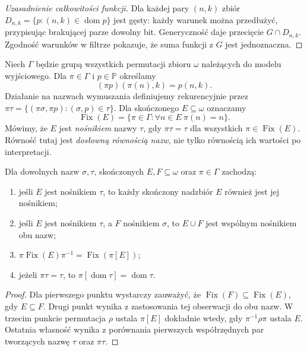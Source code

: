 \begin{proof}[Uzasadnienie całkowitości funkcji]
Dla każdej pary $(n,k)$ zbiór
$D_{n,k}=\{p:(n,k)\in\operatorname{dom}p\}$
jest gęsty: każdy warunek można przedłużyć,
przypisując brakującej parze dowolny bit.
Generyczność daje przecięcie $G\cap D_{n,k}$.
Zgodność warunków w filtrze pokazuje,
że suma funkcji z $G$ jest jednoznaczna.
\end{proof}

\begin{definicja}
\label{def:sym36-support}
Niech $\Gamma$ będzie grupą wszystkich permutacji
zbioru $\omega$ należących do modelu wyjściowego.
Dla $\pi\in\Gamma$ i $p\in\mathbb P$ określamy
\[
 (\pi p)(\pi(n),k)=p(n,k).
\]
Działanie na nazwach wymuszania definiujemy
rekurencyjnie przez
$\pi\tau=\{(\pi\sigma,\pi p):(\sigma,p)\in\tau\}$.
Dla skończonego $E\subseteq\omega$ oznaczamy
\[
 \operatorname{Fix}(E)
 =\{\pi\in\Gamma:\forall n\in E\ \pi(n)=n\}.
\]
Mówimy, że $E$ jest \emph{nośnikiem} nazwy $\tau$,
gdy $\pi\tau=\tau$ dla wszystkich
$\pi\in\operatorname{Fix}(E)$.
Równość tutaj jest \emph{dosłowną równością nazw},
nie tylko równością ich wartości po interpretacji.
\end{definicja}

\begin{lemat}
\label{lem:sym36-supports}
Dla dowolnych nazw $\sigma,\tau$, skończonych
$E,F\subseteq\omega$ oraz $\pi\in\Gamma$ zachodzą:
\begin{enumerate}
\item jeśli $E$ jest nośnikiem $\tau$, to każdy
skończony nadzbiór $E$ również jest jej nośnikiem;
\item jeśli $E$ jest nośnikiem $\tau$, a $F$ nośnikiem
$\sigma$, to $E\cup F$ jest wspólnym nośnikiem obu nazw;
\item $\pi\operatorname{Fix}(E)\pi^{-1}
=\operatorname{Fix}(\pi[E])$;
\item jeżeli $\pi\tau=\tau$, to
$\pi[\operatorname{dom}\tau]=\operatorname{dom}\tau$.
\end{enumerate}
\end{lemat}
\begin{proof}
Dla pierwszego punktu wystarczy zauważyć,
że $\operatorname{Fix}(F)\subseteq\operatorname{Fix}(E)$,
gdy $E\subseteq F$. Drugi punkt wynika z zastosowania
tej obserwacji do obu nazw. W trzecim punkcie
permutacja $\rho$ ustala $\pi[E]$ dokładnie wtedy,
gdy $\pi^{-1}\rho\pi$ ustala $E$.
Ostatnia własność wynika z porównania
pierwszych współrzędnych par tworzących
nazwę $\tau$ oraz $\pi\tau$.
\end{proof}

